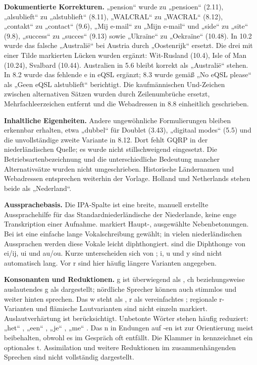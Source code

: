 \documentclass[a4paper,landscape,10pt]{article}
\newcommand{\ipa}[1]{{\ipafont[#1]}}
\begin{document}
\smallskip
\textbf{Dokumentierte Korrekturen.} „pension“ wurde zu „pensioen“ (2.11), „alsublieft“ zu „alstublieft“ (8.11),
„WALCRAL“ zu „WACRAL“ (8.12), „contakt“ zu „contact“ (9.6), „Mij e-mail“ zu „Mijn e-mail“ und „side“ zu „site“ (9.8),
„success“ zu „succes“ (9.13) sowie „Ukraïne“ zu „Oekraïne“ (10.48). In 10.2 wurde das falsche „Australië“
bei Austria durch „Oostenrijk“ ersetzt. Die drei mit einer Tilde markierten Lücken wurden ergänzt:
Wit-Rusland (10.4), Isle of Man (10.24), Svalbard (10.44). Australien in 5.6 bleibt korrekt als „Australië“ stehen.
In 8.2 wurde das fehlende e in eQSL ergänzt; 8.3 wurde gemäß „No eQSL please“ als „Geen eQSL alstublieft“ berichtigt.
Die kaufmännischen Und-Zeichen zwischen alternativen Sätzen wurden durch Zeilenumbrüche ersetzt,
Mehrfachleerzeichen entfernt und die Webadressen in 8.8 einheitlich geschrieben.

\smallskip
\textbf{Inhaltliche Eigenheiten.} Andere ungewöhnliche Formulierungen bleiben erkennbar erhalten,
etwa „dubbel“ für Doublet (3.43), „digitaal modes“ (5.5) und die unvollständige zweite Variante in 8.12.
Dort fehlt GQRP in der niederländischen Quelle; es wurde nicht stillschweigend eingesetzt.
Die Betriebsartenbezeichnung und die unterschiedliche Bedeutung mancher Alternativsätze wurden nicht umgeschrieben.
Historische Ländernamen und Webadressen entsprechen weiterhin der Vorlage. Holland und Netherlands stehen beide als „Nederland“.

\smallskip
\textbf{Aussprachebasis.} Die IPA-Spalte ist eine breite, manuell erstellte Aussprachehilfe für das
Standardniederländische der Niederlande, keine enge Transkription einer Aufnahme. \ipa{ˈ} markiert Haupt-,
\ipa{ˌ} ausgewählte Nebenbetonungen. Bei \ipa{eː, oː, øː} ist eine einfache lange Vokalschreibung gewählt;
in vielen niederländischen Aussprachen werden diese Vokale leicht diphthongiert.
\ipa{ɛi, œy, ʌu} sind die Diphthonge von ei/ij, ui und au/ou. Kurze \ipa{ɪ, ʏ, ɑ} unterscheiden sich von
\ipa{i, y, aː}; i, u und y sind nicht automatisch lang. Vor r sind hier häufig längere Varianten angegeben.

\smallskip
\textbf{Konsonanten und Reduktionen.} g ist überwiegend als \ipa{ɣ}, ch beziehungsweise auslautendes g als
\ipa{x} dargestellt; nördliche Sprecher können auch \ipa{ɣ} stimmlos und weiter hinten sprechen.
Das w steht als \ipa{ʋ}, r als vereinfachtes \ipa{r}; regionale r-Varianten und flämische Lautvarianten sind nicht einzeln markiert.
Auslautverhärtung ist berücksichtigt. Unbetonte Wörter stehen häufig reduziert: „het“ \ipa{ət}, „een“ \ipa{ən},
„je“ \ipa{jə}, „me“ \ipa{mə}. Das n in Endungen auf -en ist zur Orientierung meist beibehalten,
obwohl es im Gespräch oft entfällt. Die Klammer in \ipa{n(t)si} kennzeichnet ein optionales t.
Assimilation und weitere Reduktionen im zusammenhängenden Sprechen sind nicht vollständig dargestellt.
\end{document}
